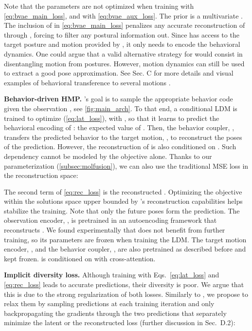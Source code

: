 \documentclass[10pt,twocolumn,letterpaper]{article}
\begin{document}
Note that the parameters  are not optimized when training with \autoref{eq:bvae_main_loss}, and  with \autoref{eq:bvae_aux_loss}. The prior  is a multivariate .
The inclusion of  in \autoref{eq:bvae_main_loss} penalizes any accurate reconstruction of  through , forcing  to filter any postural information out. Since  has access to the target posture and motion provided by , it only needs  to encode the behavioral dynamics. One could argue that a valid alternative strategy for  would consist in disentangling motion from postures. However, motion dynamics can still be used to extract a good pose approximation.
See \supp{} Sec. C for more details and visual examples of behavioral transference to several motions .



\textbf{Behavior-driven HMP.} \modelname{}'s goal is to sample the appropriate behavior code given the observation , see \autoref{fig:main_arch}.
To that end, a conditional LDM is trained to optimize  (\autoref{eq:lat_loss}), with
, so that it learns to predict the behavioral encoding of : the expected value of .
Then, the behavior coupler, , transfers the predicted behavior to the target motion, , to reconstruct the poses of the prediction. 
However, the reconstruction of  is also conditioned on . Such dependency cannot be modeled by the  objective alone. Thanks to our parameterization (\autoref{subsec:molfusion}), we can also use the traditional MSE loss in the reconstruction space:
\vspace{-0.3cm}




The second term of \autoref{eq:rec_loss} is the reconstructed . Optimizing the objective within the solutions space upper bounded by 's reconstruction capabilities helps stabilize the training. Note that only the future poses  form the prediction.
The observation encoder, , is pretrained in an autoencoding framework that reconstructs . We found experimentally that  does not benefit from further training, so its parameters  are frozen when training the LDM. The target motion encoder, , and the behavior coupler, , are also pretrained as described before and kept frozen.  is conditioned on  with cross-attention.





\textbf{Implicit diversity loss.} Although training \modelname{} with Eqs.~\ref{eq:lat_loss} and \ref{eq:rec_loss} leads to accurate predictions, their diversity is poor. We argue that this is due to the strong regularization of both losses. Similarly to \cite{fan2017point, gupta2018social}, we propose to relax them by sampling  predictions at each training iteration and only backpropagating the gradients through the two predictions that separately minimize the latent or the reconstructed loss (further discussion in \supp{} Sec.~D.2):
\vspace{-0.2cm}
\end{document}
